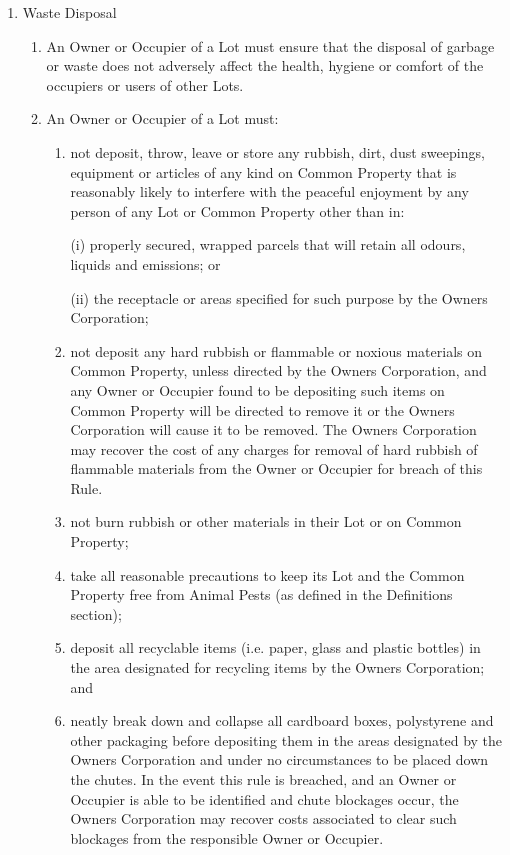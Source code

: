 \documentclass{article}
\begin{document}
\begin{enumerate}[label=\arabic*.]
\begin{enumerate}[label=\arabic{enumi}.\arabic*.]
\begin{enumerate}[label=(\arabic*)]
\end{enumerate}

\item  Waste Disposal

\begin{enumerate}[label=(\arabic*)]

\item  An Owner or Occupier of a Lot must ensure that the disposal of garbage or waste does not adversely affect the health, hygiene or comfort of the occupiers or users of other Lots.

\item  An Owner or Occupier of a Lot must:

\begin{enumerate}[label=(\alph*)]

\item  not deposit, throw, leave or store any rubbish, dirt, dust sweepings, equipment or articles of any kind on Common Property that is reasonably likely to interfere with the peaceful enjoyment by any person of any Lot or Common Property other than in:

(i) properly secured, wrapped parcels that will retain all odours, liquids and emissions; or

(ii) the receptacle or areas specified for such purpose by the Owners Corporation;

\item  not deposit any hard rubbish or flammable or noxious materials on Common Property, unless directed by the Owners Corporation, and any Owner or Occupier found to be depositing such items on Common Property will be directed to remove it or the Owners Corporation will cause it to be removed. The Owners Corporation may recover the cost of any charges for removal of hard rubbish of flammable materials from the Owner or Occupier for breach of this Rule.

\item  not burn rubbish or other materials in their Lot or on Common Property;

\item  take all reasonable precautions to keep its Lot and the Common Property free from Animal Pests (as defined in the Definitions section);

\item  deposit all recyclable items (i.e. paper, glass and plastic bottles) in the area designated for recycling items by the Owners Corporation; and

\item  neatly break down and collapse all cardboard boxes, polystyrene and other packaging before depositing them in the areas designated by the Owners Corporation and under no circumstances to be placed down the chutes. In the event this rule is breached, and an Owner or Occupier is able to be identified and chute blockages occur, the Owners Corporation may recover costs associated to clear such blockages from the responsible Owner or Occupier.


\end{enumerate}
\end{enumerate}
\end{enumerate}
\end{enumerate}
\end{document}
